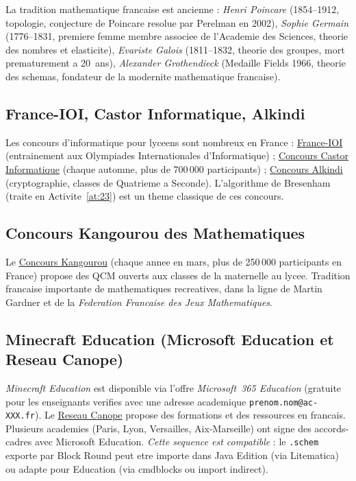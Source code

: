 \documentclass[12pt,a4paper]{scrartcl}
\begin{document}
La tradition mathematique francaise est ancienne : \emph{Henri Poincare} (1854--1912, topologie, conjecture de Poincare resolue par Perelman en 2002), \emph{Sophie Germain} (1776--1831, premiere femme membre associee de l'Academie des Sciences, theorie des nombres et elasticite), \emph{Evariste Galois} (1811--1832, theorie des groupes, mort prematurement a 20~ans), \emph{Alexander Grothendieck} (Medaille Fields 1966, theorie des schemas, fondateur de la modernite mathematique francaise).

\subsection{France-IOI, Castor Informatique, Alkindi}

Les concours d'informatique pour lyceens sont nombreux en France : \href{https://www.france-ioi.org/}{France-IOI} (entrainement aux Olympiades Internationales d'Informatique) ; \href{https://castor-informatique.fr/}{Concours Castor Informatique} (chaque automne, plus de 700\,000 participants) ; \href{https://www.concours-alkindi.fr/}{Concours Alkindi} (cryptographie, classes de Quatrieme a Seconde). L'algorithme de Bresenham (traite en Activite~\ref{at:23}) est un theme classique de ces concours.

\subsection{Concours Kangourou des Mathematiques}

Le \href{https://www.mathkang.org/}{Concours Kangourou} (chaque annee en mars, plus de 250\,000 participants en France) propose des QCM ouverts aux classes de la maternelle au lycee. Tradition francaise importante de mathematiques recreatives, dans la ligne de Martin Gardner et de la \emph{Federation Francaise des Jeux Mathematiques}.

\subsection{Minecraft Education (Microsoft Education et Reseau Canope)}\label{sec:mee}

\emph{Minecraft Education} est disponible via l'offre \emph{Microsoft~365 Education} (gratuite pour les enseignants verifies avec une adresse academique \texttt{prenom.nom@ac-XXX.fr}). Le \href{https://www.reseau-canope.fr/}{Reseau Canope} propose des formations et des ressources en francais. Plusieurs academies (Paris, Lyon, Versailles, Aix-Marseille) ont signe des accords-cadres avec Microsoft Education. \emph{Cette sequence est compatible} : le \texttt{.schem} exporte par Block Round peut etre importe dans Java Edition (via Litematica) ou adapte pour Education (via cmdblocks ou import indirect).
\end{document}
